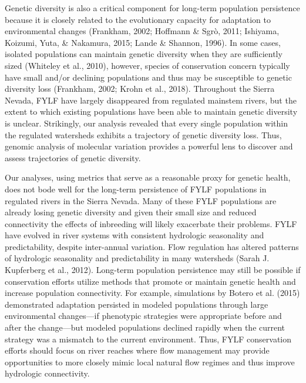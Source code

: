 \documentclass[twoside,12pt,final]{ucthesis-CA2012} %
\begin{document}
\begin{ucmainmatter}
Genetic diversity is also a critical component for long-term population
persistence because it is closely related to the evolutionary capacity
for adaptation to environmental changes (Frankham, 2002; Hoffmann \&
Sgrò, 2011; Ishiyama, Koizumi, Yuta, \& Nakamura, 2015; Lande \&
Shannon, 1996). In some cases, isolated populations can maintain genetic
diversity when they are sufficiently sized (Whiteley et al., 2010),
however, species of conservation concern typically have small and/or
declining populations and thus may be susceptible to genetic diversity
loss (Frankham, 2002; Krohn et al., 2018). Throughout the Sierra Nevada,
FYLF have largely disappeared from regulated mainstem rivers, but the
extent to which existing populations have been able to maintain genetic
diversity is unclear. Strikingly, our analysis revealed that every
single population within the regulated watersheds exhibits a trajectory
of genetic diversity loss. Thus, genomic analysis of molecular variation
provides a powerful lens to discover and assess trajectories of genetic
diversity.

Our analyses, using metrics that serve as a reasonable proxy for genetic
health, does not bode well for the long-term persistence of FYLF
populations in regulated rivers in the Sierra Nevada. Many of these FYLF
populations are already losing genetic diversity and given their small
size and reduced connectivity the effects of inbreeding will likely
exacerbate their problems. FYLF have evolved in river systems with
consistent hydrologic seasonality and predictability, despite
inter-annual variation. Flow regulation has altered patterns of
hydrologic seasonality and predictability in many watersheds (Sarah J.
Kupferberg et al., 2012). Long-term population persistence may still be
possible if conservation efforts utilize methods that promote or
maintain genetic health and increase population connectivity. For
example, simulations by Botero et al. (2015) demonstrated adaptation
persisted in modeled populations through large environmental
changes---if phenotypic strategies were appropriate before and after the
change---but modeled populations declined rapidly when the current
strategy was a mismatch to the current environment. Thus, FYLF
conservation efforts should focus on river reaches where flow management
may provide opportunities to more closely mimic local natural flow
regimes and thus improve hydrologic connectivity.


\end{ucmainmatter}
\end{document}
